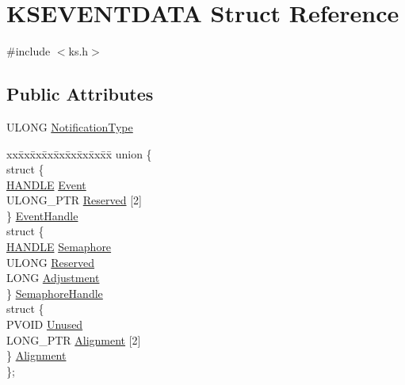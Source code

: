\hypertarget{struct_k_s_e_v_e_n_t_d_a_t_a}{}\section{K\+S\+E\+V\+E\+N\+T\+D\+A\+TA Struct Reference}
\label{struct_k_s_e_v_e_n_t_d_a_t_a}


{\ttfamily \#include $<$ks.\+h$>$}

\subsection*{Public Attributes}
\begin{DoxyCompactItemize}
\item 
U\+L\+O\+NG \hyperlink{struct_k_s_e_v_e_n_t_d_a_t_a_a3c9b214e2570e72540e3b4d44fd664c0}{Notification\+Type}
\item 
\begin{tabbing}
xx\=xx\=xx\=xx\=xx\=xx\=xx\=xx\=xx\=\kill
union \{\\
\>struct \{\\
\>\>\hyperlink{_sound_touch_d_l_l_8h_aa8c0374618b33785ccb02f74bcfebc46}{HANDLE} \hyperlink{struct_k_s_e_v_e_n_t_d_a_t_a_ad9a2147d949213d27c3ffa441dee9239}{Event}\\
\>\>ULONG\_PTR \hyperlink{struct_k_s_e_v_e_n_t_d_a_t_a_abcd051f7cade9808bc01a0c81eb9cdab}{Reserved} \mbox{[}2\mbox{]}\\
\>\} \hyperlink{struct_k_s_e_v_e_n_t_d_a_t_a_a8e09a1d74aadefb0e134793bc2dad395}{EventHandle}\\
\>struct \{\\
\>\>\hyperlink{_sound_touch_d_l_l_8h_aa8c0374618b33785ccb02f74bcfebc46}{HANDLE} \hyperlink{struct_k_s_e_v_e_n_t_d_a_t_a_a05bc538f061e5301351d5d9c205a9bc5}{Semaphore}\\
\>\>ULONG \hyperlink{struct_k_s_e_v_e_n_t_d_a_t_a_a25486f28449e7f54fdf1d97426e2f135}{Reserved}\\
\>\>LONG \hyperlink{struct_k_s_e_v_e_n_t_d_a_t_a_a1406875dc7efd16bb775487d2ca8c64c}{Adjustment}\\
\>\} \hyperlink{struct_k_s_e_v_e_n_t_d_a_t_a_a2a78d38ca4f8a7fa4830b9805ae52b47}{SemaphoreHandle}\\
\>struct \{\\
\>\>PVOID \hyperlink{struct_k_s_e_v_e_n_t_d_a_t_a_aa8f0264453d52333d3624402a5a139c8}{Unused}\\
\>\>LONG\_PTR \hyperlink{struct_k_s_e_v_e_n_t_d_a_t_a_ae2fcdc59b528aa0ecbb7223a35a1aa9d}{Alignment} \mbox{[}2\mbox{]}\\
\>\} \hyperlink{struct_k_s_e_v_e_n_t_d_a_t_a_a055446119d7195f78fd3bdea5a33c253}{Alignment}\\
\}; \\

\end{tabbing}\end{DoxyCompactItemize}


